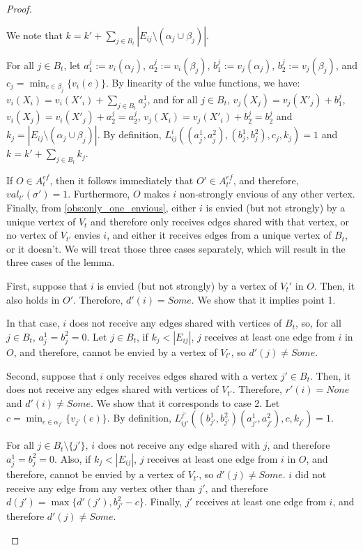 \begin{proof}
\begin{nestedproof}
        We note that $k=k'+\sum_{j\in B_t}|E_{ij}\setminus(\alpha_j\cup\beta_j)|$.

        For all $j\in B_t$, let $a^j_1:= v_i(\alpha_j)$, $a^j_2:= v_i(\beta_j)$, $b^j_1:= v_j(\alpha_j)$, $b^j_2:= v_j(\beta_j)$, and $c_j=\min_{e\in \beta_j}\{v_i(e)\}$. By linearity of the value functions, we have: $v_i(X_i)=v_i(X'_i)+\sum_{j\in B_t}a_j^1$, and for all $j\in B_t$, $v_j(X_j)=v_j(X'_j)+b^j_1$, $v_i(X_j)=v_i(X'_j)+a_2^j=a_2^j$, $v_j(X_i)=v_j(X'_i)+b_2^j=b_2^j$ and $k_j=|E_{ij}\setminus(\alpha_j\cup\beta_j)|$. By definition, $L_{ij}^i((a_j^1,a_j^2),(b_j^1,b_j^2),c_j,k_j)=1$ and $k=k'+\sum_{j\in B_t}k_j$.

        If $O\in A_t^{ef}$, then it follows immediately that $O'\in A_{t'}^{ef}$, and therefore, $val_{t'}(\sigma')=1$. Furthermore, $O$ makes $i$ non-strongly envious of any other vertex. Finally, from \cref{obs:only_one_envious}, either $i$ is envied (but not strongly) by a unique vertex of $V_t$ and therefore only receives edges shared with that vertex, or no vertex of $V_{t'}$ envies $i$, and either it receives edges from a unique vertex of $B_t$, or it doesn't. We will treat those three cases separately, which will result in the three cases of the lemma.

        First, suppose that $i$ is envied (but not strongly) by a vertex of $V_t'$ in $O$. Then, it also holds in $O'$. Therefore, $d'(i)=Some$. We show that it implies point 1.

        In that case, $i$ does not receive any edges shared with vertices of $B_t$, so, for all $j\in B_t$, $a_j^1=b_j^2=0$. Let $j\in B_t$, if $k_j<|E_{ij}|$, $j$ receives at least one edge from $i$ in $O$, and therefore, cannot be envied by a vertex of $V_{t'}$, so $d'(j)\neq Some$.

        Second, suppose that $i$ only receives edges shared with a vertex $j'\in B_t$. Then, it does not receive any edges shared with vertices of $V_{t'}$. Therefore, $r'(i)=None$ and $d'(i)\neq Some$. We show that it corresponds to case 2. Let $c=\min_{e\in \alpha_{j'}}\{v_{j'}(e)\}$. By definition, $L_{ij'}^{j'}((b_{j'}^1,b_{j'}^2)(a_{j'}^1,a_{j'}^2),c,k_{j'})=1$.

        For all $j\in B_t\setminus\{j'\}$, $i$ does not receive any edge shared with $j$, and therefore $a_{j}^1=b_{j}^2=0$. Also, if $k_j<|E_{ij}|$, $j$ receives at least one edge from $i$ in $O$, and therefore, cannot be envied by a vertex of $V_{t'}$, so $d'(j)\neq Some$. $i$ did not receive any edge from any vertex other than $j'$, and therefore $d(j')=\max\{d'(j'),b_{j'}^2-c\}$. Finally, $j'$ receives at least one edge from $i$, and therefore $d'(j)\neq Some$.


\end{nestedproof}
\end{proof}
